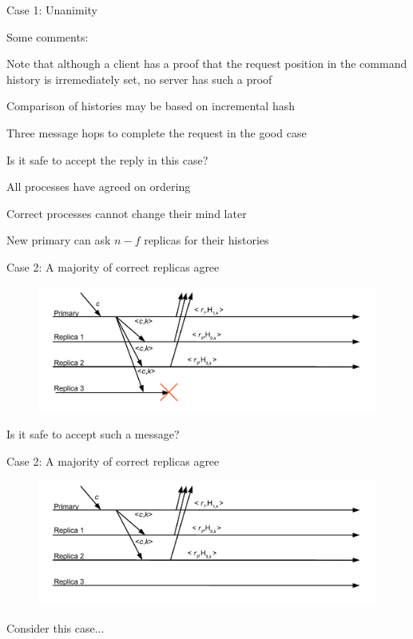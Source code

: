 \begin{frame}{Case 1: Unanimity}
	
Some comments:
\BI
\item Note that although a client has a proof that the request position
in the command history is irremediately set, no server has such a proof
\item Comparison of histories may be based on incremental hash
\item Three message hops to complete the request in the good case
\EI

\bigskip
Is it safe to accept the reply in this case?
\BI
\pause
\item All processes have agreed on ordering
\pause
\item Correct processes cannot change their mind later
\pause
\item New primary can ask $n-f$ replicas for their histories
\EI

\end{frame}

\begin{frame}{Case 2: A majority of correct replicas agree}

\begin{figure}
	\includegraphics[width=\textwidth]{figs/17/messages7}	
\end{figure}

Is it safe to accept such a message?

\end{frame}

\begin{frame}{Case 2: A majority of correct replicas agree}

\begin{figure}
	\includegraphics[width=\textwidth]{figs/17/messages8}	
\end{figure}

Consider this case...

\end{frame}

